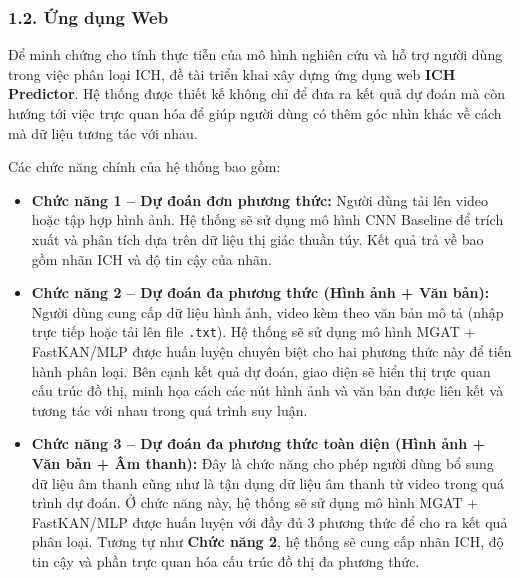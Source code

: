 \subsubsection{1.2. Ứng dụng Web}
\indent\indent Để minh chứng cho tính thực tiễn của mô hình nghiên cứu và hỗ trợ người dùng trong việc phân loại ICH, đề tài triển khai xây dựng ứng dụng web \textbf{ICH Predictor}. Hệ thống được thiết kế không chỉ để đưa ra kết quả dự đoán mà còn hướng tới việc trực quan hóa để giúp người dùng có thêm góc nhìn khác về cách mà dữ liệu tương tác với nhau.\vspace{0.3cm}

Các chức năng chính của hệ thống bao gồm:\vspace{-0.1cm}
\begin{itemize}[label={--}, itemsep=1pt]
    \item \textbf{Chức năng 1 -- Dự đoán đơn phương thức:} Người dùng tải lên video hoặc tập hợp hình ảnh. Hệ thống sẽ sử dụng mô hình CNN Baseline để trích xuất và phân tích dựa trên dữ liệu thị giác thuần túy. Kết quả trả về bao gồm nhãn ICH và độ tin cậy của nhãn.
    \item \textbf{Chức năng 2 -- Dự đoán đa phương thức (Hình ảnh + Văn bản):} Người dùng cung cấp dữ liệu hình ảnh, video kèm theo văn bản mô tả (nhập trực tiếp hoặc tải lên file \texttt{.txt}). Hệ thống sẽ sử dụng mô hình MGAT + FastKAN/MLP được huấn luyện chuyên biệt cho hai phương thức này để tiến hành phân loại. Bên cạnh kết quả dự đoán, giao diện sẽ hiển thị trực quan cấu trúc đồ thị, minh họa cách các nút hình ảnh và văn bản được liên kết và tương tác với nhau trong quá trình suy luận.
    \item \textbf{Chức năng 3 -- Dự đoán đa phương thức toàn diện (Hình ảnh + Văn bản + Âm thanh):} Đây là chức năng cho phép người dùng bổ sung dữ liệu âm thanh cũng như là tận dụng dữ liệu âm thanh từ video trong quá trình dự đoán. Ở chức năng này, hệ thống sẽ sử dụng mô hình MGAT + FastKAN/MLP được huấn luyện với đầy đủ 3 phương thức để cho ra kết quả phân loại. Tương tự như \textbf{Chức năng 2}, hệ thống sẽ cung cấp nhãn ICH, độ tin cậy và phần trực quan hóa cấu trúc đồ thị đa phương thức.
\end{itemize}